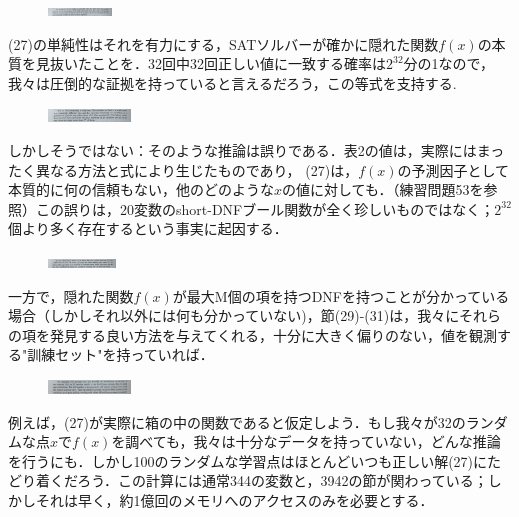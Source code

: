 \documentclass[dvipdfmx,a4paper,12pt]{jsarticle}
\begin{document}
\begin{figure}[htbp]
  \centering
  \includegraphics[width=17mm,angle=270]{images/3-2.jpg}
\end{figure}

(27)の単純性はそれを有力にする，SATソルバーが確かに隠れた関数$f(x)$の本質を見抜いたことを．32回中32回正しい値に一致する確率は$2^32$分の1なので，我々は圧倒的な証拠を持っていると言えるだろう，この等式を支持する.

\begin{figure}[htbp]
  \centering
  \includegraphics[width=22mm,angle=270]{images/3-3.jpg}
\end{figure}

 しかしそうではない：そのような推論は誤りである．表2の値は，実際にはまったく異なる方法と式により生じたものであり， (27)は，$f(x)$の予測因子として本質的に何の信頼もない，他のどのような$x$の値に対しても．（練習問題53を参照）この誤りは，20変数のshort-DNFブール関数が全く珍しいものではなく；$2^32$個より多く存在するという事実に起因する．
 \begin{figure}[htbp]
  \centering
  \includegraphics[width=18mm,angle=270]{images/3-4.jpg}
\end{figure}
一方で，隠れた関数$f(x)$が最大M個の項を持つDNFを持つことが分かっている場合（しかしそれ以外には何も分かっていない)，節(29)-(31)は，我々にそれらの項を発見する良い方法を与えてくれる，十分に大きく偏りのない，値を観測する"訓練セット"を持っていれば．

 \begin{figure}[htbp]
  \centering
  \includegraphics[width=22mm,angle=270]{images/3-5.jpg}
\end{figure}

例えば，(27)が実際に箱の中の関数であると仮定しよう．もし我々が32のランダムな点$x$で$f(x)$を調べても，我々は十分なデータを持っていない，どんな推論を行うにも．しかし100のランダムな学習点はほとんどいつも正しい解(27)にたどり着くだろう．この計算には通常344の変数と，3942の節が関わっている；しかしそれは早く，約1億回のメモリへのアクセスのみを必要とする．

\newpage
\end{document}
